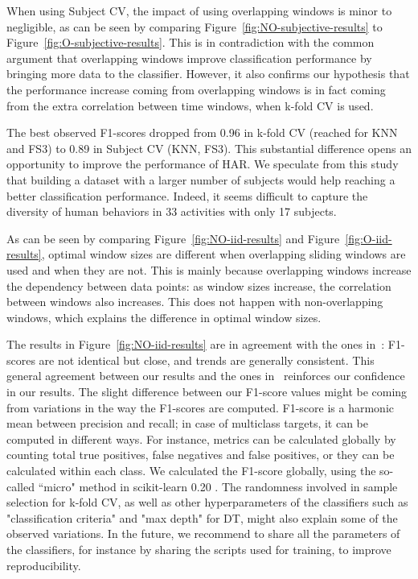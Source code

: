 \documentclass[sigconf]{acmart}
\newcommand{\TG}[1]{\color{red}\textbf{Note TG}: #1\color{black}}
\begin{document}
When using Subject CV, the impact of using overlapping windows is minor 
to negligible, as can be seen by comparing 
Figure~\ref{fig:NO-subjective-results} to 
Figure~\ref{fig:O-subjective-results}. This is in contradiction with 
the common argument that overlapping windows improve classification 
performance by bringing more data to the classifier. However, it also 
confirms our hypothesis that the performance increase coming from 
overlapping windows is in fact coming from the extra correlation 
between time windows, when k-fold CV is used.

The best observed F1-scores dropped from 0.96 in k-fold CV (reached 
for KNN and FS3) to 0.89 in Subject CV (KNN, FS3). This substantial 
difference opens an opportunity to improve the performance of 
HAR. We speculate from this study that building a dataset with a larger 
number of subjects would help reaching a better classification 
performance. Indeed, it seems difficult to capture the diversity of human behaviors in 33 
activities with only 17 subjects.

 As can be seen by comparing Figure~\ref{fig:NO-iid-results} and  Figure~\ref{fig:O-iid-results}, optimal window sizes are different when overlapping sliding windows are used and when they are not. This is mainly because overlapping windows increase the dependency between data points: as window sizes increase, the correlation between windows also increases. This does not happen with non-overlapping windows, which explains the difference in optimal window sizes.
 

The results in Figure~\ref{fig:NO-iid-results} are in agreement with the ones 
in~\cite{banos2014window}: F1-scores are not identical but close, 
and trends are generally consistent. This general agreement between our results 
and the ones in~\cite{banos2014window} reinforces our confidence in our 
results. The slight difference between our F1-score values might be 
coming from variations in the way the F1-scores are computed. F1-score 
is a harmonic mean between precision and recall; in case of multiclass 
targets, it can be computed in different ways. For instance, metrics 
can be calculated globally by counting total true positives, false 
negatives and false positives, or they can be calculated within each 
class. We calculated the F1-score globally, using the so-called ``micro" 
method in scikit-learn 0.20 \cite{pedregosa2011scikit}. The randomness 
involved in sample selection for k-fold CV, as well as other 
hyperparameters of the classifiers such as "classification criteria" and "max depth" for DT, might also explain 
some of the observed variations. In the future, we recommend to share all the parameters of the classifiers, for instance by sharing the scripts used for training, to improve reproducibility.
\end{document}
